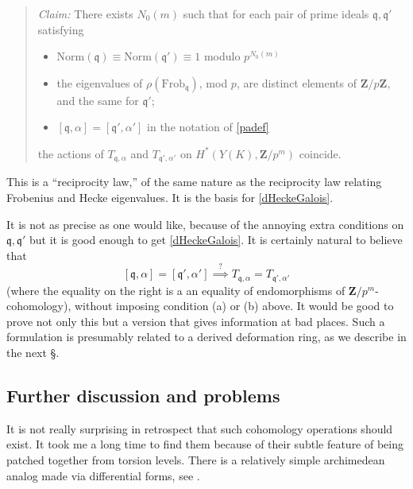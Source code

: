 \documentclass[10pt]{amsart}
\newcommand{\Z}{\mathbf{Z}}
\theoremstyle{remark}
\begin{document}
 
 \begin{quote}   {\em Claim:} There exists $N_0(m)$ such that
 for each pair of prime ideals $\mathfrak{q},\mathfrak{q}'$ satisfying 
\begin{itemize}
\item[(a)] $\mathrm{Norm}(\mathfrak{q}) \equiv \mathrm{Norm}(\mathfrak{q}' ) \equiv 1$ modulo $p^{N_0(m)}$ 
 \item[(b)] 
  the eigenvalues of $\rho(\mathrm{Frob}_{\mathfrak{q}})$, mod $p$,  are distinct elements of $\Z/p\Z$, and the same for $\mathfrak{q}'$; 
\item[(c)] 
 $ [ \mathfrak{q},\alpha ] = [\mathfrak{q}', \alpha ']$  in the notation of \eqref{padef}
 \end{itemize} 
the actions of $T_{\mathfrak{q},\alpha}$ and $T_{\mathfrak{q}', \alpha'}$
 on $H^*(Y(K), \Z/p^m)$ coincide.    
 \end{quote} 
 
 This is a ``reciprocity law,'' of the same nature as the reciprocity law relating Frobenius and Hecke eigenvalues.
 It is the basis for \eqref{dHeckeGalois}. 
 
 It is not as precise as one would like, because  of the annoying extra conditions on $\mathfrak{q},\mathfrak{q}'$ but it is good enough to get \eqref{dHeckeGalois}.
 It is certainly natural to believe that $$[\mathfrak{q},\alpha] = [\mathfrak{q}',\alpha']  \stackrel{?}{\implies} T_{\mathfrak{q},\alpha} = T_{\mathfrak{q}', \alpha'}$$
 (where the equality on the right is a an equality of endomorphisms of $\Z/p^m$-cohomology), without imposing condition (a)  or (b) above. 
  It would be good to prove not only this  but a version that gives information at bad places.  
 Such a formulation is presumably related to a derived deformation ring, as we  describe in the next \S. 
 
 
 
  
%
%
%
%
%
%
%
%
%
%
%
%
%
%
%
%
%
%
%
%
%
%
%
%
  
  

\subsection{Further discussion and problems} \label{fdp}

It is not really surprising in retrospect that such cohomology operations should exist.  It took me a  long time to find   them because
of their subtle feature of being patched together from torsion levels.   There is a relatively simple   archimedean analog made via differential forms, see \cite{PV}.  
\end{document}
